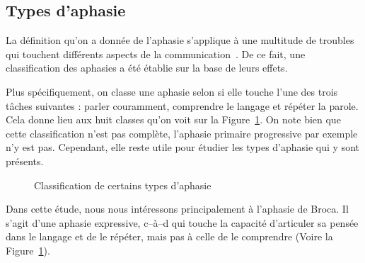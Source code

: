 \subsection{Types d'aphasie}

La définition qu'on a donnée de l'aphasie s'applique à une multitude de troubles  
qui touchent différents aspects de la communication~\cite[p. 135, 136]{Hallowell_2017}.
De ce fait, une classification des aphasies a été établie sur la base de leurs effets.

Plus spécifiquement, on classe une aphasie selon si elle touche l'une des trois tâches suivantes :
parler couramment, comprendre le langage et répéter la parole. 
Cela donne lieu aux huit classes qu'on voit sur la Figure~\ref{fig:aphasia-tree}.
On note  bien que cette classification n'est pas complète, l'aphasie primaire progressive par exemple n'y est pas.
Cependant, elle reste utile pour étudier les types d'aphasie qui y sont présents.


\begin{figure}[htb]
    \begin{center}
        \resizebox{\textwidth}{!}{}
    \end{center}
    \caption[Classification de certains types d'aphasie]
    {Classification de certains types d'aphasie~\cite{Sreedharan_2018}}
    \label{fig:aphasia-tree}
\end{figure}

Dans cette étude, nous nous intéressons principalement à l'aphasie de Broca.
Il s'agit d'une aphasie expressive, 
c--à--d qui touche la capacité d'articuler sa pensée dans le langage et de le répéter, 
mais pas à celle de le comprendre (Voire la Figure~\ref{fig:aphasia-tree}).